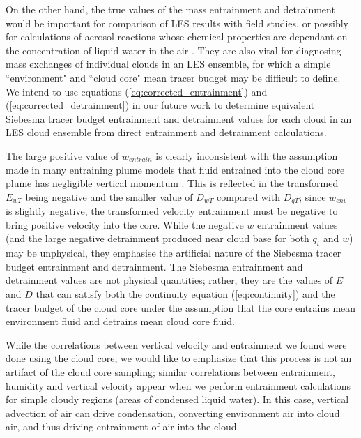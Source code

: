 \documentclass[12pt]{article}
\begin{document}
On the other hand, the true values of the mass entrainment and detrainment would
be important for comparison of LES results with field studies, or possibly for
calculations of aerosol reactions whose chemical properties are dependant on the
concentration of liquid water in the air \citep{Hoppel1994}.  They are also 
vital for diagnosing mass exchanges of individual clouds in an LES ensemble, 
for which a simple ``environment" and ``cloud core" mean tracer budget may be
difficult to define.  We intend to use equations 
(\ref{eq:corrected_entrainment}) and (\ref{eq:corrected_detrainment}) in our
future work to determine equivalent Siebesma tracer budget entrainment and
detrainment values for each cloud in an LES cloud ensemble from direct 
entrainment and detrainment calculations.

The large positive value of $w_{entrain}$ is clearly inconsistent with the
assumption made in many entraining plume models that fluid entrained into the
cloud core plume has negligible vertical momentum 
\citep{Simpson1969,Gregory2001,Siebesma2003}.  This is reflected in the 
transformed $E_{wT}$ being negative and the smaller value of $D_{wT}$ compared
with $D_{qT}$; since $w_{env}$ is slightly negative, the transformed velocity
entrainment must be negative to bring positive velocity into the core.  While
the negative $w$ entrainment values (and the large negative detrainment
produced near cloud base for both $q_t$ and $w$) may be unphysical, they
emphasise the artificial nature of the Siebesma tracer budget entrainment and
detrainment.  The Siebesma entrainment and detrainment values are not physical 
quantities; rather, they are the values of $E$ and $D$ that can satisfy both 
the continuity equation (\ref{eq:continuity}) and the tracer budget of the 
cloud core under the assumption that the core entrains mean environment fluid 
and detrains mean cloud core fluid.

While the correlations between vertical velocity and entrainment we found were done using the cloud core, we would like to emphasize that this process is not 
an artifact of the cloud core sampling; similar correlations between 
entrainment, humidity and vertical velocity appear when we perform entrainment
calculations for simple cloudy regions (areas of condensed liquid water).  In
this case, vertical advection of air can drive condensation, converting
environment air into cloud air, and thus driving entrainment of air into the
cloud.
\end{document}
